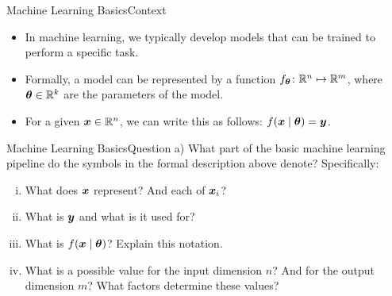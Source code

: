 \documentclass[t]{beamer}
\begin{document}
\begin{frame}{Machine Learning Basics}{Context}
    \begin{itemize}
        \item In machine learning, we typically develop models that can be
              trained to perform
              a specific task.
        \item Formally, a model can be represented by a function
              $f_{{\boldsymbol{\theta}}}\colon \mathbb{R}^n\mapsto \mathbb{R}^m$, where
              ${\boldsymbol{\theta}}\in\mathbb{R}^k$ are the parameters of the model.
        \item For a given ${\boldsymbol{x}}\in\mathbb{R}^n$, we can write this as follows:
              $f({\boldsymbol{x}}\mid{\boldsymbol{\theta}}) = {\boldsymbol{y}}$.
    \end{itemize}
\end{frame}

\begin{frame}{Machine Learning Basics}{Question a)}
    What part of the basic machine learning pipeline do the symbols in the
    formal description above denote?
    Specifically:
    \begin{enumerate}[(i)]
        \item What does ${\boldsymbol{x}}$ represent? And each of ${\boldsymbol{x}}_i$?
        \item What is ${\boldsymbol{y}}$ and what is it used for?
        \item What is $f({\boldsymbol{x}}\mid{\boldsymbol{\theta}})$? Explain this notation.
        \item What is a possible value for the input dimension $n$?
              And for the output dimension $m$? What factors determine
              these values?
    \end{enumerate}
\end{frame}
\end{document}
